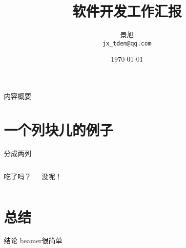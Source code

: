 \documentclass[compress]{beamer}
\title[Group TDEM of Prof. Xiu Li]{软件开发工作汇报}
\author[Xu Jing]{景旭 \\ \texttt{jx\_tdem@qq.com}}
\institute{长安大学地质工程与测绘学院}
\date{\today}
\begin{document}
	
	\frame{\titlepage}
	
	\begin{frame}{内容概要}
		\tableofcontents[hideallsubsections]
	\end{frame}
	
	\section{一个列块儿的例子}
	\begin{frame}{分成两列}
		
		\begin{columns}
			
			吃了吗？
			
			没呢！
		\end{columns}
	\end{frame}
	
	
	\section{总结}
	\begin{frame}{结论}
		beamer很简单
	\end{frame}
	
	
	
\end{document}
